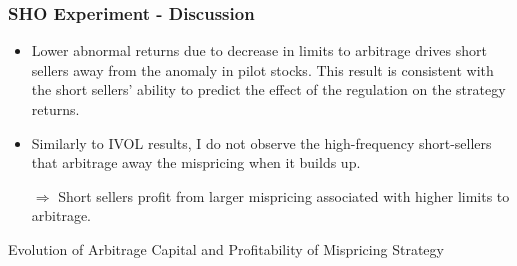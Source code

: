\documentclass{beamer}
\begin{document}
\begin{frame}
	\frametitle{SHO Experiment - Discussion}
\begin{itemize}
\item Lower abnormal returns due to decrease in limits to arbitrage drives short sellers away from the anomaly in pilot stocks. This result is consistent with the short sellers' ability to predict the effect of the regulation on the strategy returns.
\item Similarly to IVOL results, I do not observe the high-frequency short-sellers that arbitrage away the mispricing when it builds up.

\item[$\Rightarrow$] Short sellers profit from larger mispricing associated with higher limits to arbitrage.
 
\end{itemize}
\end{frame}

\begin{frame}
\begin{center}
\Large Evolution of Arbitrage Capital and Profitability of Mispricing Strategy
\end{center}

\end{frame}
\end{document}
